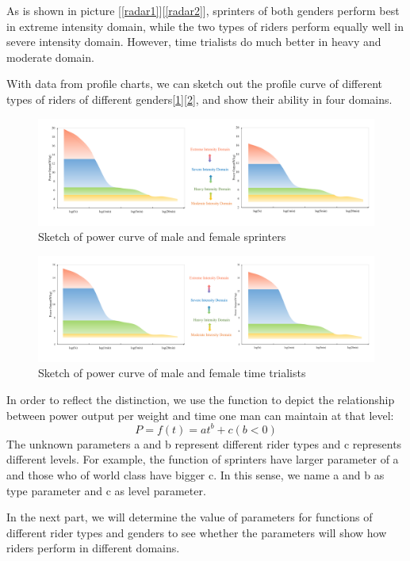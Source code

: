 \par As is shown in picture [\ref{radar1}][\ref{radar2}], sprinters  of both genders perform best in extreme intensity domain, while the two types of riders perform equally well in severe intensity domain. However, time trialists do much better in heavy and moderate domain.
\par With data from profile charts, we can sketch out the profile curve of different types of riders of different genders[\ref{sketch1}][\ref{sketch2}], and show their ability in four domains.
\begin{figure}[h]
	\centering
	\includegraphics[width=1.0\linewidth]{image/sprinter}
	\caption{Sketch of power curve of male and female sprinters}
	\label{sketch1}
\end{figure}
\begin{figure}[h]
	\centering
	\includegraphics[width=1.0\linewidth]{"image/time trival"}
	\caption{Sketch of power curve of male and female time trialists}
	\label{sketch2}
\end{figure}

\par In order to reflect the distinction, we use the function to depict the relationship between power output per weight and time one man can maintain at that level:  
\begin{equation}
	\label{func}
	P=f(t)=at^b+c (b<0)
\end{equation}
The unknown parameters a and b represent different rider types and c represents different levels. For example, the function of sprinters have larger parameter of a and those who of world class have bigger c. In this sense, we name a and b as type parameter and c as level parameter.
\par In the next part, we will determine the value of parameters for functions of different rider types and genders to see whether the parameters will show how riders perform in different domains.
